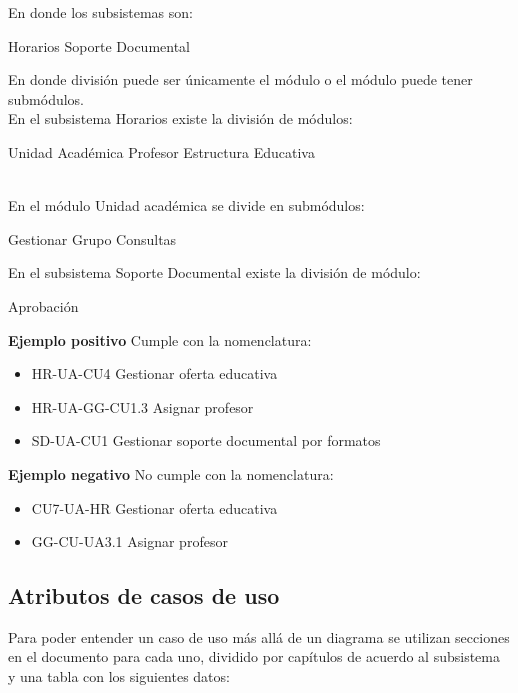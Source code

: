 En donde los subsistemas son:
\\
\begin{Titemize}
	\Titem [HR:] Horarios
	\Titem [SD:] Soporte Documental
\end{Titemize}

En donde división puede ser únicamente el módulo o el módulo puede tener submódulos.\\
 En el subsistema Horarios existe la división de módulos:\\
\begin{Titemize}
	\Titem [UA:] Unidad Académica
	\Titem [PR:] Profesor
	\Titem [EE:] Estructura Educativa
\end{Titemize}
\cdtEmpty
\\En el módulo Unidad académica se divide en submódulos:\\
\begin{Titemize}
	\Titem [GG:] Gestionar Grupo
	\Titem [CO:] Consultas
\end{Titemize}

En el subsistema Soporte Documental existe la división de módulo:\\
\begin{Titemize}
	\Titem [AP:] Aprobación
\end{Titemize}


\textbf{Ejemplo positivo} Cumple con la nomenclatura:
\begin{itemize}
	\item HR-UA-CU4 Gestionar oferta educativa
	\item HR-UA-GG-CU1.3 Asignar profesor
	\item SD-UA-CU1 Gestionar soporte documental por formatos
\end{itemize}


\textbf{Ejemplo negativo} No cumple con la nomenclatura:
\begin{itemize}
	\item CU7-UA-HR Gestionar oferta educativa
	\item GG-CU-UA3.1 Asignar profesor
\end{itemize}


\subsection{Atributos de casos de uso}

Para poder entender un caso de uso más allá de un diagrama se utilizan secciones en el documento para cada uno, dividido por capítulos de acuerdo al subsistema y una tabla con los siguientes datos:

